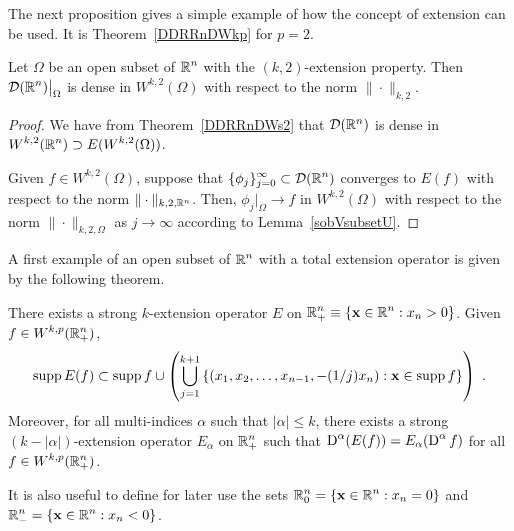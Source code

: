 The next proposition gives a simple example of how the concept of
extension can be used.  It is Theorem~\ref{DDRRnDWkp} for $p=2$.

\begin{theorem} \label{sob_dense_ext_H}
Let $\Omega$ be an open subset of $\displaystyle \mathbb{R}^n$ with the
$(k,2)$-extension property.  Then
$\displaystyle \mathcal{D}(\mathbb{R}^n)\big|_{\Omega}$ is dense in
$\displaystyle W^{k,2}(\Omega)$ with respect to the norm $\|\cdot\|_{k,2}$.
\end{theorem}

\begin{proof}
We have from Theorem~\ref{DDRRnDWs2} that $\mathcal{D}(\mathbb{R}^n)$ is dense in
$\displaystyle W^{k,2}(\mathbb{R}^n) \supset E(W^{k,2}(\Omega))$.

Given $\displaystyle f\in W^{k,2}(\Omega)$, suppose that
$\displaystyle \{\phi_j\}_{j=0}^\infty \subset \mathcal{D}(\mathbb{R}^n)$ converges
to $E(f)$ with respect to the norm $\|\cdot\|_{k,2,\mathbb{R}^n}$.  Then,
$\phi_j\big|_\Omega \rightarrow f$ in
$\displaystyle W^{k,2}(\Omega)$ with respect
to the norm $\|\cdot\|_{k,2,\Omega}$ as $j\rightarrow \infty$
according to Lemma~\ref{sobVsubsetU}.
\end{proof}

A first example of an open subset of $\displaystyle \mathbb{R}^n$ with a
total extension operator is given by the following theorem.

\begin{theorem} \label{sob_Rp_ext}
There exists a strong $k$-extension operator $E$ on
$\displaystyle \mathbb{R}^n_+ \equiv \{ \mathbf{x} \in \mathbb{R}^n : x_n>0 \}$.
Given $\displaystyle f \in W^{k,p}(\mathbb{R}^n_+)$,
\[
\operatorname{supp} E(f) \subset \operatorname{supp} f \cup 
\left( \bigcup_{j=1}^{k+1} \left\{
(x_1,x_2,\ldots,x_{n-1},-(1/j)x_n): \mathbf{x} \in \operatorname{supp} f \right\} \right) \ .
\]
Moreover, for all multi-indices $\alpha$ such that $|\alpha|\leq k$,
there exists a strong $(k-|\alpha|)$-extension operator $E_\alpha$ on
$\displaystyle \mathbb{R}^n_+$ such that
$\displaystyle \operatorname{D}^\alpha (E(f)) = E_\alpha(\operatorname{D}^\alpha f)$ for all
$\displaystyle f \in W^{k,p}(\mathbb{R}^n_+)$.
\end{theorem}

\begin{rmk}
It is also useful to define for later use the sets
$\displaystyle \mathbb{R}^n_0 = \{ \mathbf{x} \in \mathbb{R}^n : x_n=0 \}$ and
$\displaystyle \mathbb{R}^n_- = \{ \mathbf{x} \in \mathbb{R}^n : x_n<0 \}$.
\end{rmk}

